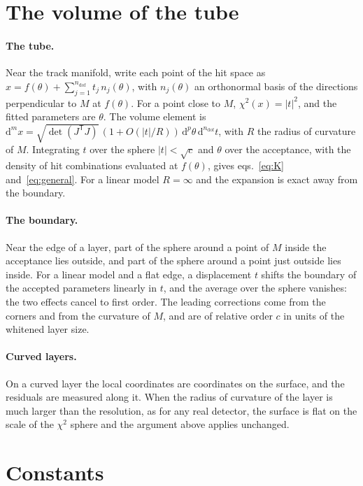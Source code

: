 \IfFileExists{jinst.cls}{\documentclass[a4paper,11pt]{jinst}}
\newcommand{\ndof}{n_\mathrm{dof}}
\newcommand{\dd}{\mathrm{d}}
\begin{document}
\section{The volume of the tube}\label{app:tube}

\paragraph{The tube.} Near the track manifold, write each point of the hit space as
$x=f(\theta)+\sum_{j=1}^{\ndof}t_j\,n_j(\theta)$, with $n_j(\theta)$ an orthonormal basis of the
directions perpendicular to $M$ at $f(\theta)$. For a point close to $M$, $\chi^2(x)=|t|^2$, and
the fitted parameters are $\theta$. The volume element is
$\dd^mx=\sqrt{\det(J^\mathsf{T}J)}\,(1+O(|t|/R))\,\dd^p\theta\,\dd^{\ndof}t$, with $R$ the radius of
curvature of $M$. Integrating $t$ over the sphere $|t|<\sqrt c$ and $\theta$ over the acceptance,
with the density of hit combinations evaluated at $f(\theta)$, gives eqs.~\eqref{eq:K}
and~\eqref{eq:general}. For a linear model $R=\infty$ and the expansion is exact away from the
boundary.

\paragraph{The boundary.} Near the edge of a layer, part of the sphere around a point of $M$ inside
the acceptance lies outside, and part of the sphere around a point just outside lies inside. For a
linear model and a flat edge, a displacement $t$ shifts the boundary of the accepted parameters
linearly in $t$, and the average over the sphere vanishes: the two effects cancel to first order.
The leading corrections come from the corners and from the curvature of $M$, and are of relative
order $c$ in units of the whitened layer size.

\paragraph{Curved layers.} On a curved layer the local coordinates are coordinates on the surface,
and the residuals are measured along it. When the radius of curvature of the layer is much larger
than the resolution, as for any real detector, the surface is flat on the scale of the $\chi^2$
sphere and the argument above applies unchanged.

\section{Constants}\label{app:constants}
\end{document}

